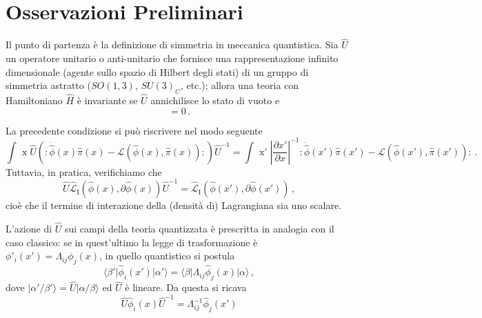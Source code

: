 \documentclass{article}
\begin{document}
\section{Osservazioni Preliminari}

Il punto di partenza è la definizione di simmetria in meccanica quantistica. Sia $\hat{U}$ un operatore unitario o anti-unitario che fornisce una rappresentazione infinito dimensionale (agente sullo spazio di Hilbert degli stati) di un gruppo di simmetria astratto ($SO(1,3)$, $SU(3)_C$, etc.); allora una teoria con Hamiltoniano $\hat{H}$ è invariante se $\hat{U}$ annichilisce lo stato di vuoto e
\begin{equation}
  [\hat{U},\hat{H}] = 0 \, .
\end{equation}

La precedente condizione si può riscrivere nel modo seguente
\begin{equation}
  \int \! \mathop{d^3 \! x} \hat{U} \left( : \! \dot{\hat{\phi}}(x) \hat{\pi}(x) - \mathcal{L}(\hat{\phi}(x), \hat{\pi}(x)) \! : \right) \hat{U}^{-1}  = \int \! \mathop{d^3 \! x'} \left\vert \frac{\partial x'}{\partial x} \right\vert^{-1} : \! \dot{\hat{\phi}}(x') \hat{\pi}(x') - \mathcal{L}(\hat{\phi}(x'), \hat{\pi}(x')) \! : \, .
\end{equation}
Tuttavia, in pratica, verifichiamo che
\begin{equation}
  \hat{U} \hat{\mathcal{L}}_\text{I}(\hat{\phi}(x),\partial \hat{\phi}(x)) \hat{U}^{-1} = \hat{\mathcal{L}}_\text{I}(\hat{\phi}(x'),\partial \hat{\phi}(x')) \, ,
\end{equation}
cioè che il termine di interazione della (densità di) Lagrangiana sia uno scalare.

L'azione di $\hat{U}$ sui campi della teoria quantizzata è prescritta in analogia con il caso classico: se in quest'ultimo la legge di trasformazione è $\phi'_i (x') = \Lambda_{i j} \phi_j (x)$, in quello quantistico si postula
\begin{equation}
  \langle \beta' \vert \hat{\phi}_i (x') \vert \alpha' \rangle = \langle \beta \vert \Lambda_{i j} \hat{\phi}_j (x) \vert \alpha \rangle \, ,
  \label{eq:quantum_transformation_rule}
\end{equation}
dove $\vert \alpha'/\beta' \rangle = \hat{U} \vert \alpha/\beta \rangle$ ed $\hat{U}$ è lineare. Da questa si ricava
\begin{equation}
  \hat{U} \hat{\phi}_i (x) \hat{U}^{-1} = \Lambda^{-1}_{i j} \hat{\phi}_j(x')
\end{equation}
\end{document}
